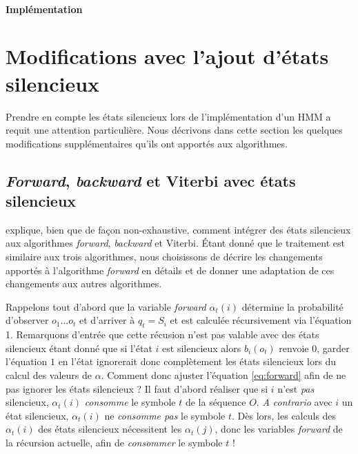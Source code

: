 \documentclass[letterpaper]{article}
\begin{document}
\paragraph{Implémentation}
\section{Modifications avec l'ajout d'états silencieux}
Prendre en compte les états silencieux lors de l'implémentation d'un HMM a requit une attention particulière. Nous décrivons dans cette section les quelques modifications supplémentaires qu'ils ont apportés aux algorithmes.  \\

\subsection{\textit{Forward}, \textit{backward} et Viterbi avec états silencieux}
\cite{Durbin} explique, bien que de façon non-exhaustive, comment intégrer des états silencieux aux algorithmes \textit{forward}, \textit{backward} et Viterbi. Étant donné que le traitement est similaire aux trois algorithmes, nous choisissons de décrire les changements apportés à l'algorithme \textit{forward} en détails et de donner une adaptation de ces changements aux autres algorithmes.

Rappelons tout d'abord que la variable \textit{forward} $\alpha_t(i)$ détermine la probabilité d'observer $o_1\dots o_t$ et d'arriver à $q_t =  S_i$ et est calculée récursivement via l'équation 1. Remarquons d'entrée que cette récusion n'est pas valable avec des états silencieux étant donné que si l'état $i$ est silencieux alors $b_i(o_t)$ renvoie $0$, garder l'équation $1$ en l'état ignorerait donc complètement les états silencieux lors du calcul des valeurs de $\alpha$. Comment donc ajuster l'équation \ref{eq:forward} afin de ne pas ignorer les états silencieux ? Il faut d'abord réaliser que si $i$ n'est \textit{pas} silencieux, $\alpha_t(i)$ \textit{consomme} le symbole $t$ de la séquence $O$. \textit{A contrario} avec $i$ un état silencieux, $\alpha_t(i)$ ne \textit{consomme pas} le symbole $t$. Dès lors, les calculs des $\alpha_t(i)$ des états silencieux nécessitent les $\alpha_t(j)$, donc les variables \textit{forward} de la récursion actuelle, afin de \textit{consommer} le symbole $t$ ! \\
\end{document}
